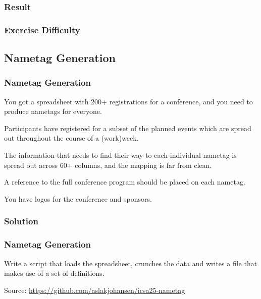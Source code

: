 {\subsubsection{Result}
\begin{frame}[fragile]
  \frametitle{Exercise Difficulty }
\end{frame}

\subsection{Nametag Generation}
\begin{frame}[fragile]
  \frametitle{Nametag Generation}
  \pause
  \vspace{3mm}
  You got a spreadsheet with 200+ registrations for a conference, and you need to produce nametags for everyone.
  
  \pause
  \vspace{5mm}
  Participants have registered for a subset of the planned events which are spread out throughout the course of a (work)week.
  
  \pause
  \vspace{5mm}
  The information that needs to find their way to each individual nametag is spread out across 60+ columns, and the mapping is far from clean.
  
  \pause
  \vspace{5mm}
  A reference to the full conference program should be placed on each nametag.
  
  \pause
  \vspace{5mm}
  You have logos for the conference and sponsors.
\end{frame}

\subsubsection{Solution}
\begin{frame}[fragile]
  \frametitle{Nametag Generation }
  \vspace{3mm}
  Write a script that loads the spreadsheet, crunches the data and writes a  file that makes use of a set of definitions.
  
  \vspace{5mm}
  Source: \url{https://github.com/aslakjohansen/icsa25-nametag}
\end{frame}

}

